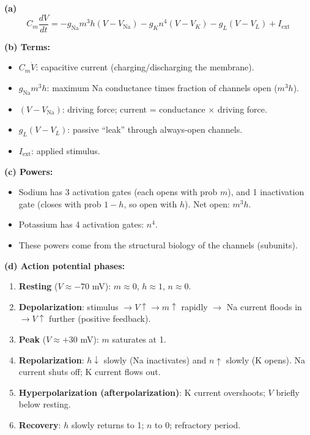 \documentclass[10pt]{article}
\begin{document}
\begin{solution}
\textbf{(a)}
\[
C_m \frac{dV}{dt} = -g_\text{Na} m^3 h(V - V_\text{Na}) - g_K n^4(V - V_K) - g_L(V - V_L) + I_\text{ext}
\]

\textbf{(b) Terms:}
\begin{itemize}
\item $C_m \dot V$: capacitive current (charging/discharging the membrane).
\item $g_\text{Na} m^3 h$: maximum Na conductance times fraction of channels open ($m^3 h$).
\item $(V - V_\text{Na})$: driving force; current = conductance $\times$ driving force.
\item $g_L (V - V_L)$: passive ``leak'' through always-open channels.
\item $I_\text{ext}$: applied stimulus.
\end{itemize}

\textbf{(c) Powers:} 
\begin{itemize}
\item Sodium has 3 activation gates (each opens with prob $m$), and 1 inactivation gate (closes with prob $1-h$, so open with $h$). Net open: $m^3 h$.
\item Potassium has 4 activation gates: $n^4$.
\item These powers come from the structural biology of the channels (subunits).
\end{itemize}

\textbf{(d) Action potential phases:}
\begin{enumerate}
\item \textbf{Resting} ($V \approx -70$ mV): $m \approx 0$, $h \approx 1$, $n \approx 0$.
\item \textbf{Depolarization}: stimulus $\to V \uparrow \to m \uparrow$ rapidly $\to$ Na current floods in $\to V \uparrow$ further (positive feedback).
\item \textbf{Peak} ($V \approx +30$ mV): $m$ saturates at 1.
\item \textbf{Repolarization}: $h \downarrow$ slowly (Na inactivates) and $n \uparrow$ slowly (K opens). Na current shuts off; K current flows out.
\item \textbf{Hyperpolarization (afterpolarization)}: K current overshoots; $V$ briefly below resting.
\item \textbf{Recovery}: $h$ slowly returns to 1; $n$ to 0; refractory period.
\end{enumerate}
\end{solution}
\end{document}

